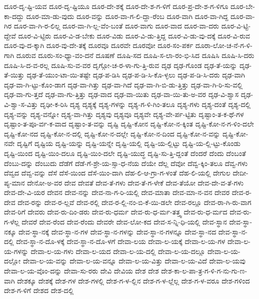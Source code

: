 {ದೂರ-ದೃ-ಷ್ಟಿ-ಯವ
ದೂರ-ದೃ-ಷ್ಟಿಯೂ
ದೂರ-ದೇ-ಶಕ್ಕೆ
ದೂರ-ದೇ-ಶ-ಗ-ಳಿಗೆ
ದೂರ-ಪ್ರ-ದೇ-ಶ-ಗ-ಳಿಗೂ
ದೂರ-ಬೇ-ಕಾ-ದದ್ದು
ದೂರ-ಮಾ-ಡು-ವುದು
ದೂರ-ವನ್ನು
ದೂರ-ವಾ-ಗ-ಲಿ-ದ್ದಾ-ರೆಂಬ
ದೂರ-ವಾಗಿ
ದೂರ-ವಾ-ಗಿದ್ದ
ದೂರ-ವಾ-ಗಿರ
ದೂರ-ವಾ-ಗಿ-ರ-ಲಿಲ್ಲ
ದೂರ-ವಾ-ಗಿ-ಲ್ಲ-ವೆಂ-ಬಂತೆ
ದೂರ-ವಾಗು
ದೂರ-ವಾದ
ದೂರ-ವಾ-ದರು
ದೂರ-ವಿ-ಟ್ಟಿ-ದ್ದೇವೆ
ದೂರ-ವಿ-ಟ್ಟಿರು
ದೂರ-ವಿ-ಡ-ಬೇಕು
ದೂರ-ವಿಡು
ದೂರ-ವಿ-ಡು-ತ್ತಿದ್ದ
ದೂರ-ವಿ-ಡು-ವು-ದಕ್ಕೆ
ದೂರ-ವಿ-ರುವ
ದೂರ-ವು-ದ-ಕ್ಕಾಗಿ
ದೂರ-ವು-ದೇ-ತಕ್ಕೆ
ದೂರವೂ
ದೂರವೇ
ದೂರವೋ
ದೂರ-ಸಂ-ಪರ್ಕ
ದೂರಾ-ಲೋ-ಚ-ನೆ-ಗ-ಳಿ-ಗಾಗಿ
ದೂರುವ
ದೂರು-ಸಂ-ಧ್ಯಾ-ವಂ-ದನೆ
ದೂಷಣೆ
ದೂಷಿ-ಸದ
ದೂಷಿ-ಸ-ಲಾ-ರಂ-ಭಿ-ಸಿದ
ದೂಷಿಸಿ
ದೂಷಿ-ಸಿ-ದರು
ದೂಷಿ-ಸಿ-ದ-ವ-ರಲ್ಲ
ದೂಷಿ-ಸು-ವ-ವರ
ದೃಗ್ಗೋ-ಚ-ರ-ಳಾ-ಗು-ತ್ತಿ-ರುವ
ದೃಢ
ದೃಢ-ಗೊಂಡ
ದೃಢ-ತೆ-ಯನ್ನು
ದೃಢ-ತೆ-ಯಿತ್ತು
ದೃಢ-ತೆ-ಯುಂ-ಟಾ-ಯಿ-ತಷ್ಟೇ
ದೃಢ-ಪ-ಡಿಸಿ
ದೃಢ-ಪ-ಡಿ-ಸಿ-ಕೊ-ಳ್ಳಲು
ದೃಢ-ಪ-ಡಿ-ಸಿ-ದರು
ದೃಢ-ವಾಗಿ
ದೃಢ-ವಾ-ಗಿ-ಟ್ಟು-ಕೊಂ-ಡಾಗ
ದೃಢ-ವಾ-ಗಿತ್ತು
ದೃಢ-ವಾ-ಗಿದೆ
ದೃಢ-ವಾ-ಗಿ-ಬಿ-ಡು-ತ್ತಿತ್ತು
ದೃಢ-ವಾ-ಗಿ-ರಿ-ಸು-ವಲ್ಲಿ
ದೃಢ-ವಾ-ಗು-ತ್ತದೆ
ದೃಢ-ವಾ-ಗು-ತ್ತಿತ್ತು
ದೃಢ-ವಾದ
ದೃಢ-ವಾ-ಯಿತು
ದೃಢ-ವಾ-ಯಿ-ತು-ಅ-ವರ
ದೃಢ-ವಿ-ಶ್ವಾಸ
ದೃಢ-ವಿ-ಶ್ವಾ-ಸ-ವಿತ್ತು
ದೃಢೀ-ಕ-ರಿಸಿ
ದೃಶ್ಯ
ದೃಶ್ಯಕ್ಕೆ
ದೃಶ್ಯ-ಗಳನ್ನು
ದೃಶ್ಯ-ಗ-ಳಿ-ಗಿಂ-ತಲೂ
ದೃಶ್ಯ-ಗಳು
ದೃಶ್ಯ-ದಂತೆ
ದೃಶ್ಯ-ದಲ್ಲಿ
ದೃಶ್ಯ-ವನ್ನು
ದೃಶ್ಯ-ವನ್ನೋ
ದೃಶ್ಯ-ವಾ-ಗಿತ್ತು
ದೃಶ್ಯವು
ದೃಶ್ಯವೂ
ದೃಶ್ಯವೇ
ದೃಶ್ಯ-ವೇ-ರ್ಪ-ಟ್ಟಿತು
ದೃಷ್ಟಾಂ-ತ-ಕ-ಥೆ-ಗಳ
ದೃಷ್ಟಾಂ-ತ-ಪೂ-ರ್ವ-ಕ-ವಾದ
ದೃಷ್ಟಾಂ-ತ-ವನ್ನು
ದೃಷ್ಟಿ
ದೃಷ್ಟಿ-ಕೋನ
ದೃಷ್ಟಿ-ಕೋ-ನ-ಕ್ಕಿಂತ
ದೃಷ್ಟಿ-ಕೋ-ನ-ಗ-ಳಿಂ-ದಲೇ
ದೃಷ್ಟಿ-ಕೋ-ನದ
ದೃಷ್ಟಿ-ಕೋ-ನ-ದಲ್ಲಿ
ದೃಷ್ಟಿ-ಕೋ-ನ-ದಲ್ಲೇ
ದೃಷ್ಟಿ-ಕೋ-ನ-ದಿಂದ
ದೃಷ್ಟಿ-ಕೋ-ನ-ವನ್ನು
ದೃಷ್ಟಿ-ಕೋ-ನವೇ
ದೃಷ್ಟಿಗೆ
ದೃಷ್ಟಿಯ
ದೃಷ್ಟಿ-ಯನ್ನು
ದೃಷ್ಟಿ-ಯನ್ನೇ
ದೃಷ್ಟಿ-ಯಲ್ಲಿ
ದೃಷ್ಟಿ-ಯ-ಲ್ಲಿಟ್ಟು
ದೃಷ್ಟಿ-ಯ-ಲ್ಲಿ-ಟ್ಟು-ಕೊಂಡು
ದೃಷ್ಟಿ-ಯಿಂದ
ದೃಷ್ಟಿ-ಯಿಂ-ದಲೂ
ದೃಷ್ಟಿ-ಯಿಂ-ದಲೇ
ದೃಷ್ಟಿ-ಯುದ್ಧ
ದೃಷ್ಟಿ-ಸು-ತ್ತಿ-ದ್ದಂತೆ
ದೆಂದರೆ
ದೆಂದು
ದೆಂಬಂತೆ
ದೆಂಬು-ದನ್ನು
ದೆಂಬುದು
ದೆಡೆಗೆ
ದೆಡೆ-ಗೆ-ಶ್ರೇ-ಯ-ಸ್ಸಾ-ಧ-ನೆಯ
ದೆಯೇ
ದೆಲ್ಲ
ದೆವೋ
ದೆವ್ವ-ಕ್ಕಿಂ-ತಲೂ
ದೆವ್ವ-ಗಳು
ದೆವ್ವದ
ದೆವ್ವ-ವನ್ನು
ದೆಸೆ
ದೆಸೆ-ಯಿಂದ
ದೆಸೆ-ಯಿಂ-ದಾಗಿ
ದೆಹ-ಲಿ-ಆ-ಗ್ರಾ-ಗ-ಳಂತೆ
ದೆಹ-ಲಿ-ಯಲ್ಲಿ
ದೇಗುಲ
ದೇದೀ-ಪ್ಯ-ಮಾನ
ದೇನೋ-ಅ-ವರ
ದೇವ
ದೇವತೆ
ದೇವ-ತೆ-ಗಳು
ದೇವ-ತೆ-ಗ-ಳೇಕೆ
ದೇವ-ತೆಯೋ
ದೇವ-ದೇ-ವ-ತೆ-ಗಳು
ದೇವ-ದೇ-ವಿ-ಯರ
ದೇವನ
ದೇವ-ನನ್ನು
ದೇವ-ನಾ-ಗ-ರಿ-ಯಲ್ಲಿ
ದೇವ-ಮಾತಾ
ದೇವ-ಮಾ-ನ-ವನ
ದೇವರ
ದೇವ-ರ-ದೇವ
ದೇವ-ರನ್ನು
ದೇವ-ರ-ಲ್ಲವೆ
ದೇವ-ರಲ್ಲಿ
ದೇವ-ರ-ಲ್ಲಿ-ನಂ-ಬಿ-ಕೆ-ಯಿ-ಡಲೇ
ದೇವ-ರಲ್ಲೂ
ದೇವ-ರಾ-ಗಿ-ರು-ವಾಗ
ದೇವ-ರಿಗೆ
ದೇವರು
ದೇವ-ರು-ದಿಂ-ಡರು
ದೇವ-ರು-ಧರ್ಮ
ದೇವ-ರು-ಧ-ರ್ಮ-ತತ್ತ್ವ
ದೇವ-ರು-ಧ-ರ್ಮದ
ದೇವ-ರು-ಗ-ಳೆಲ್ಲ
ದೇವರೆ
ದೇವ-ರೆಂದ
ದೇವ-ರೆಂದು
ದೇವರೇ
ದೇವ-ಲೋ-ಕದ
ದೇವ-ಸ-ನ್ನಿ-ಧಿ-ಯಲ್ಲಿ
ದೇವ-ಸ್ಥಾನ
ದೇವ-ಸ್ಥಾ-ನಕ್ಕೂ
ದೇವ-ಸ್ಥಾ-ನಕ್ಕೆ
ದೇವ-ಸ್ಥಾ-ನ-ಗಳ
ದೇವ-ಸ್ಥಾ-ನ-ಗಳನ್ನು
ದೇವ-ಸ್ಥಾ-ನ-ಗಳನ್ನೂ
ದೇವ-ಸ್ಥಾ-ನದ
ದೇವ-ಸ್ಥಾ-ನ-ದಲ್ಲಿ
ದೇವ-ಸ್ಥಾ-ನ-ದೊ-ಳಕ್ಕೆ
ದೇವ-ಸ್ಥಾ-ನ-ದೊ-ಳಗೆ
ದೇವಾ-ಲಯ
ದೇವಾ-ಲ-ಯಕ್ಕೆ
ದೇವಾ-ಲ-ಯ-ಗಳ
ದೇವಾ-ಲ-ಯ-ಗಳನ್ನು
ದೇವಾ-ಲ-ಯ-ಗಳು
ದೇವಾ-ಲ-ಯದ
ದೇವಾ-ಲ-ಯ-ದಲ್ಲಿ
ದೇವಾ-ಲ-ಯ-ದಲ್ಲೂ
ದೇವಾ-ಲ-ಯ-ದಲ್ಲೋ
ದೇವಾ-ಲ-ಯ-ವನ್ನು
ದೇವಾ-ಲ-ಯ-ವನ್ನೂ
ದೇವಾ-ಲ-ಯ-ವಿತ್ತು
ದೇವಾ-ಲ-ಯ-ವಿದೆ
ದೇವಾ-ಲ-ಯವು
ದೇವಾ-ಲ-ಯ-ವೊಂ-ದನ್ನು
ದೇವಾ-ಸು-ರರು
ದೇವಿ
ದೇವಿಯ
ದೇಶ
ದೇಶ
ದೇಶ-ಕಾ-ಲ-ಪಾ-ತ್ರ-ಗ-ಳಿ-ಗ-ನು-ಗು-ಣ-ವಾಗಿ
ದೇಶಕ್ಕೂ
ದೇಶಕ್ಕೆ
ದೇಶ-ಗಳ
ದೇಶ-ಗಳಲ್ಲಿ
ದೇಶ-ಗ-ಳ-ಲ್ಲಿನ
ದೇಶ-ಗ-ಳ-ಲ್ಲೆಲ್ಲ
ದೇಶ-ಗ-ಳ-ವರೂ
ದೇಶ-ಗಳಿಂದ
ದೇಶ-ಗ-ಳಿಗೆ
ದೇಶದ
ದೇಶ-ದಲ್ಲಿ
}
